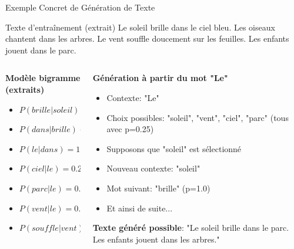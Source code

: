 \documentclass[aspectratio=169,11pt]{beamer}
\begin{document}
\begin{frame}{Exemple Concret de Génération de Texte}
    \begin{exampleblock}{Texte d'entraînement (extrait)}
        \small{Le soleil brille dans le ciel bleu. Les oiseaux chantent dans les arbres. Le vent souffle doucement sur les feuilles. Les enfants jouent dans le parc.}
    \end{exampleblock}
    
    \vspace{0.2cm}
    \begin{columns}
        \begin{column}{0.5\textwidth}
            \textbf{Modèle bigramme (extraits)}
            \begin{itemize}
                \item $P(brille|soleil) = 1.0$
                \item $P(dans|brille) = 1.0$
                \item $P(le|dans) = 1.0$
                \item $P(ciel|le) = 0.25$
                \item $P(parc|le) = 0.25$
                \item $P(vent|le) = 0.25$
                \item $P(souffle|vent) = 1.0$
            \end{itemize}
        \end{column}
        \begin{column}{0.5\textwidth}
            \textbf{Génération à partir du mot "Le"}
            \begin{itemize}
                \item Contexte: "Le"
                \item Choix possibles: "soleil", "vent", "ciel", "parc" (tous avec p=0.25)
                \item Supposons que "soleil" est sélectionné
                \item Nouveau contexte: "soleil"
                \item Mot suivant: "brille" (p=1.0)
                \item Et ainsi de suite...
            \end{itemize}
            
            \textbf{Texte généré possible}:
            \small{"Le soleil brille dans le parc. Les enfants jouent dans les arbres."}
        \end{column}
    \end{columns}
\end{frame}
\end{document}
